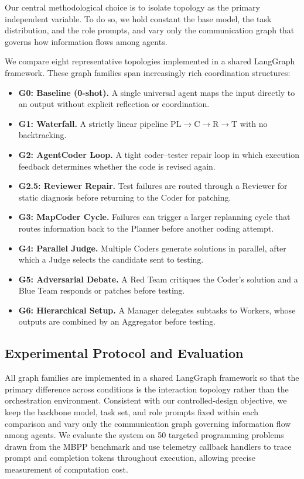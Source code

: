 \documentclass[manuscript,screen,review]{acmart}
\begin{document}
Our central methodological choice is to isolate topology as the primary independent variable. To do so, we hold constant the base model, the task distribution, and the role prompts, and vary only the communication graph that governs how information flows among agents.

We compare eight representative topologies implemented in a shared LangGraph framework. These graph families span increasingly rich coordination structures:

\begin{itemize}
    \item \textbf{G0: Baseline (0-shot).} A single universal agent maps the input directly to an output without explicit reflection or coordination.
    \item \textbf{G1: Waterfall.} A strictly linear pipeline $\text{PL} \rightarrow \text{C} \rightarrow \text{R} \rightarrow \text{T}$ with no backtracking.
    \item \textbf{G2: AgentCoder Loop.} A tight coder–tester repair loop in which execution feedback determines whether the code is revised again.
    \item \textbf{G2.5: Reviewer Repair.} Test failures are routed through a Reviewer for static diagnosis before returning to the Coder for patching.
    \item \textbf{G3: MapCoder Cycle.} Failures can trigger a larger replanning cycle that routes information back to the Planner before another coding attempt.
    \item \textbf{G4: Parallel Judge.} Multiple Coders generate solutions in parallel, after which a Judge selects the candidate sent to testing.
    \item \textbf{G5: Adversarial Debate.} A Red Team critiques the Coder’s solution and a Blue Team responds or patches before testing.
    \item \textbf{G6: Hierarchical Setup.} A Manager delegates subtasks to Workers, whose outputs are combined by an Aggregator before testing.
\end{itemize}

\subsection{Experimental Protocol and Evaluation}

All graph families are implemented in a shared LangGraph framework so that the primary difference across conditions is the interaction topology rather than the orchestration environment. Consistent with our controlled-design objective, we keep the backbone model, task set, and role prompts fixed within each comparison and vary only the communication graph governing information flow among agents. We evaluate the system on 50 targeted programming problems drawn from the MBPP benchmark and use telemetry callback handlers to trace prompt and completion tokens throughout execution, allowing precise measurement of computation cost.
\end{document}
